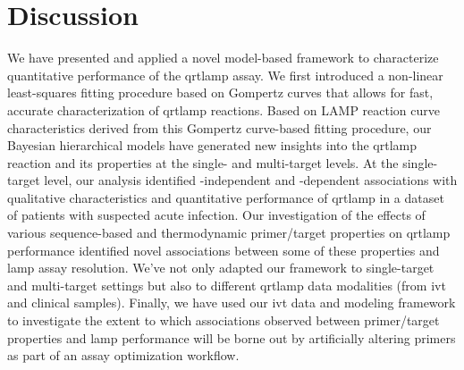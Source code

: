 \documentclass[../thesis.tex]{subfiles}
\begin{document}
\section{Discussion \label{sec:discussion}}
We have presented and applied a novel model-based framework to characterize quantitative performance of the \gls{qrtlamp} assay. We first introduced a non-linear least-squares fitting procedure based on Gompertz curves that allows for fast, accurate characterization of \gls{qrtlamp} reactions. Based on LAMP reaction curve characteristics derived from this Gompertz curve-based fitting procedure, our Bayesian hierarchical models  have generated new insights into the \gls{qrtlamp} reaction and its properties at the single- and multi-target levels. At the single-target level, our analysis identified -independent and -dependent associations with qualitative characteristics and quantitative performance of \gls{qrtlamp} in a dataset of patients with suspected acute infection. Our investigation of the effects of various sequence-based and thermodynamic primer/target properties on \gls{qrtlamp} performance identified novel associations between some of these properties and \gls{lamp} assay resolution. We've not only adapted our framework to single-target and multi-target settings but also to different \gls{qrtlamp} data modalities (from \gls{ivt}  and clinical samples). Finally, we have used our \gls{ivt}  data and modeling framework to investigate the extent to which associations observed between primer/target properties and \gls{lamp} performance will be borne out by artificially altering primers as part of an assay optimization workflow. 
\end{document}
